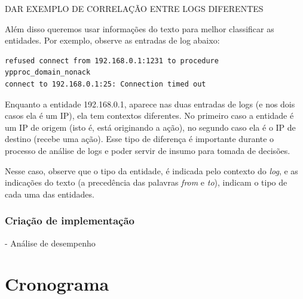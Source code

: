 \documentclass[
	12pt,				%
	openright,			%
	twoside,			%
	a4paper,			%
	english,			%
	french,				%
	spanish,			%
	brazil,				%
	]{abntex2}
\begin{document}
DAR EXEMPLO DE CORRELAÇÃO ENTRE LOGS DIFERENTES

Além disso queremos usar informações do texto para melhor classificar as entidades.
Por exemplo, observe as entradas de log abaixo:

{\tiny
\begin{verbatim}
refused connect from 192.168.0.1:1231 to procedure ypproc_domain_nonack 
connect to 192.168.0.1:25: Connection timed out
\end{verbatim}
}

Enquanto a entidade 192.168.0.1, aparece nas duas entradas de logs (e nos dois casos ela é um IP), ela tem contextos diferentes. No primeiro caso a entidade é um IP de origem (isto é, está originando a ação), no segundo caso ela é o IP de destino (recebe uma ação). Esse tipo de diferença é importante durante o processo de análise de logs e poder servir de insumo para tomada de decisões.

Nesse caso, observe que o tipo da entidade, é indicada pelo contexto do \emph{log}, e as indicações do texto (a precedência das palavras \emph{from} e \emph{to}), indicam o tipo de cada uma das entidades.

\cite{bird2009natural}

\subsection{Criação de implementação}

- Análise de desempenho

\chapter{Cronograma}\label{chap:cronograma}



\postextual


\end{document}
